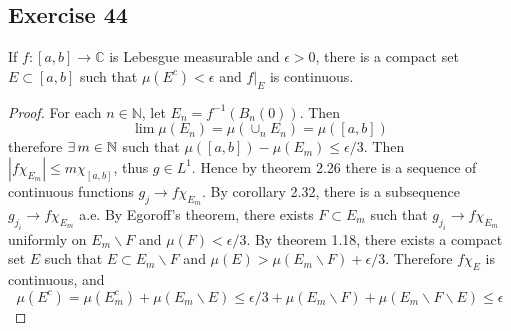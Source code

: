 \subsection*{Exercise 44}
If $f:[a,b]\to\mathbb{C}$ is Lebesgue measurable and $\epsilon>0$, there is a compact set $E\subset[a,b]$ such that $\mu(E^c)<\epsilon$ and $f|_E$ is continuous.
\begin{proof}
    For each $n\in\mathbb{N}$, let $E_n=f^{-1}(B_n(0))$. Then
    $$
    \lim\mu(E_n)=\mu(\cup_nE_n)=\mu([a,b])
    $$
    therefore $\exists\, m\in\mathbb{N}$ such that $\mu([a,b])-\mu(E_m)\le\epsilon/3$. Then $|f\chi_{E_m}|\le m\chi_{[a,b]}$, thus $g\in L^1$. Hence by theorem 2.26 there is a sequence of continuous functions $g_j\to f\chi_{E_m}$. By corollary 2.32, there is a subsequence $g_{j_i}\to f\chi_{E_m}$ a.e. By Egoroff's theorem, there exists $F\subset E_m$ such that $g_{j_i}\to f\chi_{E_m}$ uniformly on $E_m\backslash F$ and $\mu(F)<\epsilon/3$. By theorem 1.18, there exists a compact set $E$ such that $E\subset E_m\backslash F$ and $\mu(E)>\mu(E_m\backslash F)+\epsilon/3$. Therefore $f\chi_E$ is continuous, and 
    $$
    \mu(E^c)=\mu(E_m^c)+\mu(E_m\backslash E)\le\epsilon/3+\mu(E_m\backslash F)+\mu(E_m\backslash F\backslash E)\le\epsilon
    $$
\end{proof}